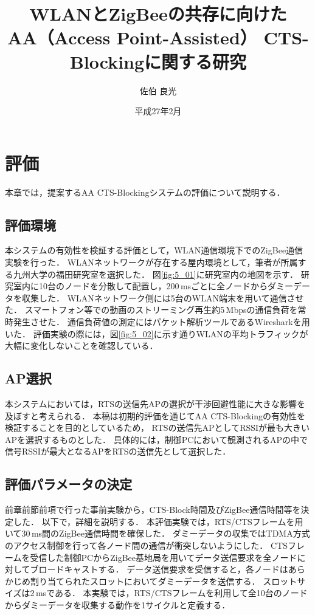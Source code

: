 \documentclass[12pt]{jreport}
\date{平成27年2月}
\title{\fontsize{15.5pt}{25pt}\selectfont WLANとZigBeeの共存に向けた\\AA（Access Point-Assisted） CTS-Blockingに関する研究}
\author{佐伯 良光}
\begin{document}
\maketitle


\chapter{評価}\label{implement}%

本章では，提案するAA CTS-Blockingシステムの評価について説明する．\\

\section{評価環境}

本システムの有効性を検証する評価として，WLAN通信環境下でのZigBee通信実験を行った．
WLANネットワークが存在する屋内環境として，筆者が所属する九州大学の福田研究室を選択した．
図\ref{fig:5_01}に研究室内の地図を示す．
研究室内に10台のノードを分散して配置し，200\,msごとに全ノードからダミーデータを収集した．
WLANネットワーク側には5台のWLAN端末を用いて通信させた．
スマートフォン等での動画のストリーミング再生約5\,Mbpsの通信負荷を常時発生させた．
通信負荷値の測定にはパケット解析ツールであるWiresharkを用いた．
評価実験の際には，図\ref{fig:5_02}に示す通りWLANの平均トラフィックが大幅に変化しないことを確認している．

\section{AP選択}

本システムにおいては，RTSの送信先APの選択が干渉回避性能に大きな影響を及ぼすと考えられる．
本稿は初期的評価を通じてAA CTS-Blockingの有効性を検証することを目的としているため，
RTSの送信先APとしてRSSIが最も大きいAPを選択するものとした．
具体的には，制御PCにおいて観測されるAPの中で信号RSSIが最大となるAPをRTSの送信先として選択した．

\section{評価パラメータの決定}

前章前節前項で行った事前実験から，CTS-Block時間及びZigBee通信時間等を決定した．
以下で，詳細を説明する．
本評価実験では，RTS/CTSフレームを用いて30\,ms間のZigBee通信時間を確保した．
ダミーデータの収集ではTDMA方式のアクセス制御を行って各ノード間の通信が衝突しないようにした．
CTSフレームを受信した制御PCからZigBee基地局を用いてデータ送信要求を全ノードに対してブロードキャストする．
データ送信要求を受信すると，各ノードはあらかじめ割り当てられたスロットにおいてダミーデータを送信する．
スロットサイズは2\,msである．
本実験では，RTS/CTSフレームを利用して全10台のノードからダミーデータを収集する動作を1サイクルと定義する．
\end{document}
